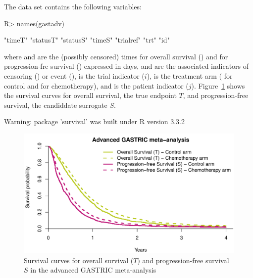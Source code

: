 \documentclass[article,shortnames, nojss]{jss}\usepackage[]{graphicx}\usepackage[]{color}
\begin{document}
The data set contains the following variables:
\begin{Schunk}
\begin{Sinput}
R> names(gastadv)
\end{Sinput}
\begin{Soutput}
[1] "timeT"    "statusT"  "statusS"  "timeS"    "trialref" "trt"      "id"      
\end{Soutput}
\end{Schunk}
where  and  are the (possibly censored) times 
for overall survival () and
for progression-fre survival () expressed in days,
 and  are the associated indicators of
censoring () or event (),
 is the trial indicator ($i$),
 is the treatment arm ( for control and  for chemotherapy),
and  is the patient indicator ($j$).
Figure~\ref{fig:survCurves} shows the survival curves for overall survival,
the true endpoint $T$, and progression-free survival,
the candiddate surrogate $S$.
\begin{Schunk}
\begin{Soutput}
Warning: package 'survival' was built under R version 3.3.2
\end{Soutput}
\begin{figure}
\includegraphics[width=\textwidth]{./survCurves-1} \caption[Survival curves for overall survival ($T$) and progression-free survival $S$ in the advanced GASTRIC meta-analysis \citep{GASTRIC13}]{Survival curves for overall survival ($T$) and progression-free survival $S$ in the advanced GASTRIC meta-analysis \citep{GASTRIC13}}\label{fig:survCurves}
\end{figure}
\end{Schunk}

  
\end{document}
